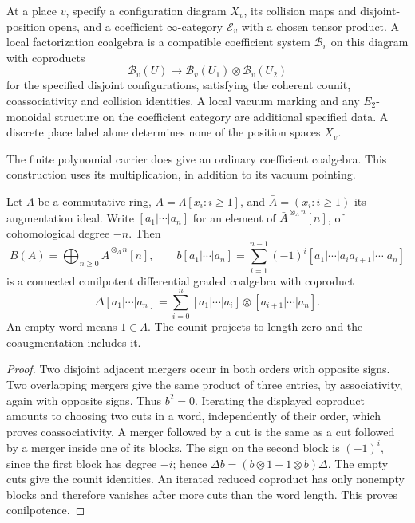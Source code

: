 \begin{definition}
\label{v4-arith:pos-costello:def:local-factorization}
At a place \(v\), specify a configuration diagram \(X_v\), its
collision maps and disjoint-position opens, and a coefficient \(\infty\)-category
\(\mathcal E_v\) with a chosen tensor product. A local factorization
coalgebra is a compatible coefficient system \(\mathcal B_v\) on
this diagram with coproducts
\[
 \mathcal B_v(U)\longrightarrow
 \mathcal B_v(U_1)\otimes\mathcal B_v(U_2)
\]
for the specified disjoint configurations, satisfying the coherent
counit, coassociativity and collision identities. A local vacuum
marking and any \(E_2\)-monoidal structure on the coefficient
category are additional specified data. A discrete place label
alone determines none of the position spaces \(X_v\).
\end{definition}

The finite polynomial carrier does give an ordinary coefficient
coalgebra. This construction uses its multiplication, in addition
to its vacuum pointing.

\begin{proposition}
\label{v4-arith:pos-costello:prop:local-factorization-exists}
Let \(\Lambda\) be a commutative ring,
\(A=\Lambda[x_i:i\ge1]\), and \(\bar A=(x_i:i\ge1)\) its
augmentation ideal. Write \([a_1|\cdots|a_n]\) for an element of
\(\bar A^{\otimes_\Lambda n}[n]\), of cohomological degree \(-n\).
Then
\[
 B(A)=\bigoplus_{n\ge0}\bar A^{\otimes_\Lambda n}[n],\qquad
 b[a_1|\cdots|a_n]
  =\sum_{i=1}^{n-1}(-1)^i
            [a_1|\cdots|a_ia_{i+1}|\cdots|a_n]
\]
is a connected conilpotent differential graded coalgebra with
coproduct
\[
 \Delta[a_1|\cdots|a_n]
   =\sum_{i=0}^n[a_1|\cdots|a_i]\otimes[a_{i+1}|\cdots|a_n].
\]
An empty word means \(1\in\Lambda\). The counit projects to
length zero and the coaugmentation includes it.
\end{proposition}

\begin{proof}
Two disjoint adjacent mergers occur in both orders with opposite
signs. Two overlapping mergers give the same product of three
entries, by associativity, again with opposite signs. Thus
\(b^2=0\). Iterating the displayed coproduct amounts to choosing
two cuts in a word, independently of their order, which proves
coassociativity. A merger followed by a cut is the same as a cut
followed by a merger inside one of its blocks. The sign on the
second block is \((-1)^i\), since the first block has degree
\(-i\); hence \(\Delta b=(b\otimes1+1\otimes b)\Delta\).
The empty cuts give the counit identities. An iterated reduced
coproduct has only nonempty blocks and therefore vanishes after
more cuts than the word length. This proves conilpotence.
\end{proof}

